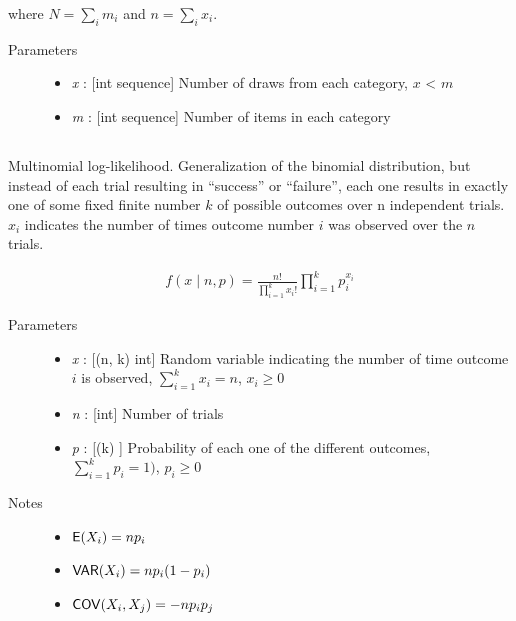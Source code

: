 \documentclass[]{jss}
\begin{document}
where $N = \sum_i m_i$ and $n = \sum_i x_i$.
\begin{description}
\item[Parameters] \leavevmode\begin{itemize}
\item {} 
\emph{x} : {[}int sequence{]} Number of draws from each category, $x$ \textless{} $m$

\item {} 
\emph{m} : {[}int sequence{]} Number of items in each category

\end{itemize}

\end{description}

\subsection[multinomial]{ }

Multinomial log-likelihood. Generalization of the binomial
distribution, but instead of each trial resulting in ``success'' or
``failure'', each one results in exactly one of some fixed finite number $k$
of possible outcomes over n independent trials. $x_i$ indicates the number
of times outcome number $i$ was observed over the $n$ trials.

\begin{eqnarray*}
f(x \mid n, p) = \frac{n!}{\prod_{i=1}^k x_i!} \prod_{i=1}^k p_i^{x_i}    
\end{eqnarray*}
    
\begin{description}
\item[Parameters] \leavevmode\begin{itemize}
\item{} 

\emph{x} : {[}(n, k) int{]} Random variable indicating the number of time outcome $i$ is 
observed, $\sum_{i=1}^k x_i=n$, $x_i \ge 0$

\item{} 
\emph{n} : {[}int{]}
Number of trials

\item {}
\emph{p} : {[}(k) {]} Probability of each one of the different outcomes,
$\sum_{i=1}^k p_i = 1)$, $p_i \ge 0$



\end{itemize}

\item[Notes]\begin{itemize}
\item {} 
$\mathsf{E}(X_i)=n p_i$

\item {} 
$\mathsf{VAR}(X_i)=n p_i(1-p_i)$

\item {} 
$\mathsf{COV}(X_i,X_j) = -n p_i p_j$

\end{itemize}

\end{description}
\end{document}
